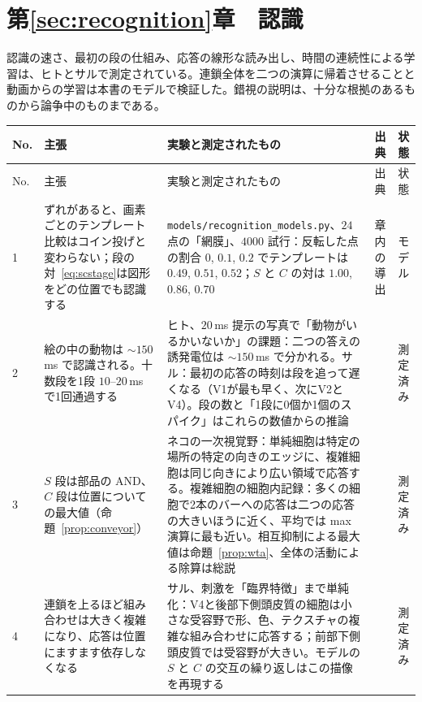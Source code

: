 \section{第\ref{sec:recognition}章　認識}

認識の速さ、最初の段の仕組み、応答の線形な読み出し、時間の連続性による学習は、ヒトとサルで測定されている。連鎖全体を二つの演算に帰着させることと動画からの学習は本書のモデルで検証した。錯視の説明は、十分な根拠のあるものから論争中のものまである。

{\footnotesize
\setlength{\tabcolsep}{3pt}\renewcommand{\arraystretch}{1.15}
\begin{longtable}{>{\raggedright}p{0.5cm}>{\raggedright}p{4.0cm}>{\raggedright}p{5.6cm}>{\raggedright}p{2.3cm}>{\raggedright\arraybackslash}p{1.7cm}}
\toprule
No. & 主張 & 実験と測定されたもの & 出典 & 状態 \\
\midrule\endfirsthead
\toprule
No. & 主張 & 実験と測定されたもの & 出典 & 状態 \\
\midrule\endhead
1 & ずれがあると、画素ごとのテンプレート比較はコイン投げと変わらない；段の対~\eqref{eq:scstage}は図形をどの位置でも認識する & \texttt{models/\allowbreak recognition\_models.py}、$24$ 点の「網膜」、$4000$ 試行：反転した点の割合 $0$, $0.1$, $0.2$ でテンプレートは $0.49$, $0.51$, $0.52$；$S$ と $C$ の対は $1.00$, $0.86$, $0.70$ & 章内の導出 & モデル \\
2 & 絵の中の動物は $\sim150$\,ms で認識される。十数段を1段 $10$--$20$\,ms で1回通過する & ヒト、$20$\,ms 提示の写真で「動物がいるかいないか」の課題：二つの答えの誘発電位は $\sim150$\,ms で分かれる。サル：最初の応答の時刻は段を追って遅くなる（V1が最も早く、次にV2とV4）。段の数と「1段に0個か1個のスパイク」はこれらの数値からの推論 & \cite{Thorpe1996,Schmolesky1998} & 測定済み \\
3 & $S$ 段は部品の AND、$C$ 段は位置についての最大値（命題~\ref{prop:conveyor}） & ネコの一次視覚野：単純細胞は特定の場所の特定の向きのエッジに、複雑細胞は同じ向きにより広い領域で応答する。複雑細胞の細胞内記録：多くの細胞で2本のバーへの応答は二つの応答の大きいほうに近く、平均では max 演算に最も近い。相互抑制による最大値は命題~\ref{prop:wta}、全体の活動による除算は総説 & \cite{HubelWiesel1962,Lampl2004,Carandini2012} & 測定済み \\
4 & 連鎖を上るほど組み合わせは大きく複雑になり、応答は位置にますます依存しなくなる & サル、刺激を「臨界特徴」まで単純化：V4と後部下側頭皮質の細胞は小さな受容野で形、色、テクスチャの複雑な組み合わせに応答する；前部下側頭皮質では受容野が大きい。モデルの $S$ と $C$ の交互の繰り返しはこの描像を再現する & \cite{KobatakeTanaka1994,Riesenhuber1999} & 測定済み \\

\end{longtable}}
